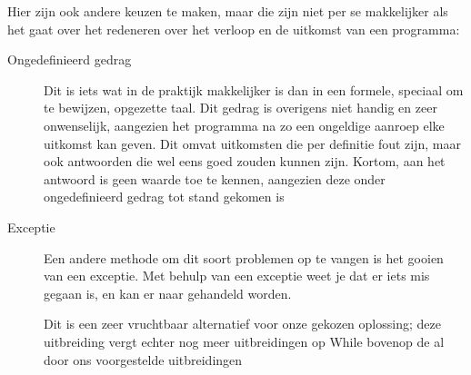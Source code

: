 Hier zijn ook andere keuzen te maken, maar die zijn niet per se makkelijker als het gaat over het redeneren over het
verloop en de uitkomst van een programma:
\begin{description}
\item[Ongedefinieerd gedrag] Dit is iets wat in de praktijk makkelijker is dan in een formele, speciaal om te bewijzen,
opgezette taal. Dit gedrag is overigens niet handig en zeer onwenselijk, aangezien het programma na zo een ongeldige
aanroep elke uitkomst kan geven. Dit omvat uitkomsten die per definitie fout zijn, maar ook antwoorden die wel eens
goed zouden kunnen zijn. Kortom, aan het antwoord is geen waarde toe te kennen, aangezien deze onder ongedefinieerd
gedrag tot stand gekomen is
\item[Exceptie] Een andere methode om dit soort problemen op te vangen is het gooien van een exceptie. Met behulp van
een exceptie weet je dat er iets mis gegaan is, en kan er naar gehandeld worden.

Dit is een zeer vruchtbaar alternatief voor onze gekozen oplossing; deze uitbreiding vergt echter nog meer
uitbreidingen op While bovenop de al door ons voorgestelde uitbreidingen
\end{description}
